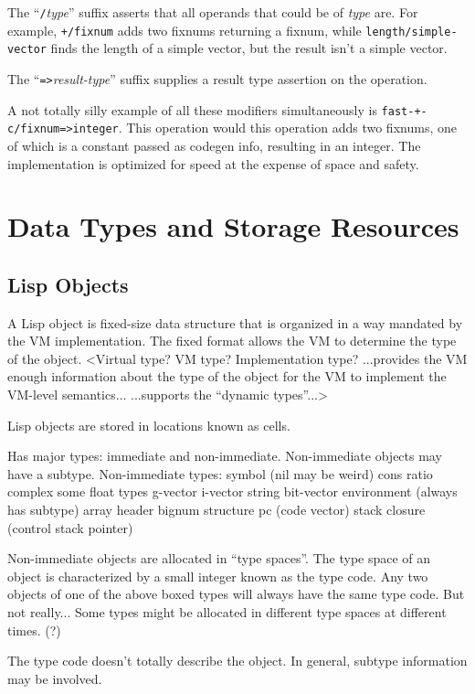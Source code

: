 The ``{\tt /}{\it type}'' suffix asserts that all operands that could be of {\it type} are.
For example, {\tt +/fixnum} adds two fixnums returning a fixnum, while
{\tt length/simple-vector} finds the length of a simple vector, but the result isn't
a simple vector.

The ``{\tt =>}{\it result-type}'' suffix supplies a result type assertion on the
operation.

A not totally silly example of all these modifiers simultaneously is
 {\tt fast-+-c/fixnum=>integer}.  This operation would this operation adds two
fixnums, one of which is a constant passed as codegen info, resulting in an
integer.  The implementation is optimized for speed at the expense of space and
safety.



\chapter{Data Types and Storage Resources}


\section{Lisp Objects}

A Lisp object is fixed-size data structure that is organized in a way mandated
by the VM implementation.  The fixed format allows the VM to determine the type
of the object.  \comment<Virtual type?  VM type?  Implementation type?
...provides the VM enough information about the type of the object for the VM
to implement the VM-level semantics...  ...supports the ``dynamic types''...>

Lisp objects are stored in locations known as cells. 


Has major types: immediate and non-immediate.
Non-immediate objects may have a subtype.
Non-immediate types:
  symbol (nil may be weird)
  cons 
  ratio
  complex
  some float types
  g-vector
  i-vector
  string
  bit-vector
  environment (always has subtype)
  array header
  bignum
  structure
  pc (code vector)
  stack closure (control stack pointer)

Non-immediate objects are allocated in ``type spaces''.  The type space of an
object is characterized by a small integer known as the type code.  Any two
objects of one of the above boxed types will always have the same type code.
{But not really...  Some types might be allocated in different type spaces at
different times. (?)}

The type code doesn't totally describe the object.  In general, subtype
information may be involved.


